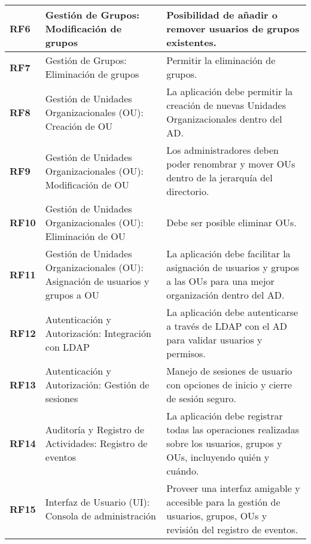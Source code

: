 \begin{longtable}{|l|p{5cm}|p{8.5cm}|}
    \textbf{RF6}   & Gestión de Grupos: Modificación de grupos                                       & Posibilidad de añadir o remover usuarios de grupos existentes.                                                             \\ \hline
    \textbf{RF7}   & Gestión de Grupos: Eliminación de grupos                                        & Permitir la eliminación de grupos.                                                                                         \\ \hline
    \textbf{RF8}   & Gestión de Unidades Organizacionales (OU): Creación de OU                       & La aplicación debe permitir la creación de nuevas Unidades Organizacionales dentro del AD.                                 \\ \hline
    \textbf{RF9}   & Gestión de Unidades Organizacionales (OU): Modificación de OU                   & Los administradores deben poder renombrar y mover OUs dentro de la jerarquía del directorio.                               \\ \hline
    \textbf{RF10}  & Gestión de Unidades Organizacionales (OU): Eliminación de OU                    & Debe ser posible eliminar OUs.                                                                                            \\ \hline
    \textbf{RF11}  & Gestión de Unidades Organizacionales (OU): Asignación de usuarios y grupos a OU & La aplicación debe facilitar la asignación de usuarios y grupos a las OUs para una mejor organización dentro del AD.       \\ \hline
    \textbf{RF12}  & Autenticación y Autorización: Integración con LDAP                              & La aplicación debe autenticarse a través de LDAP con el AD para validar usuarios y permisos.                               \\ \hline
    \textbf{RF13}  & Autenticación y Autorización: Gestión de sesiones                               & Manejo de sesiones de usuario con opciones de inicio y cierre de sesión seguro.                                            \\ \hline
    \textbf{RF14}  & Auditoría y Registro de Actividades: Registro de eventos                        & La aplicación debe registrar todas las operaciones realizadas sobre los usuarios, grupos y OUs, incluyendo quién y cuándo. \\ \hline
    \textbf{RF15}  & Interfaz de Usuario (UI): Consola de administración                             & Proveer una interfaz amigable y accesible para la gestión de usuarios, grupos, OUs y revisión del registro de eventos.     \\ \hline

\end{longtable}
